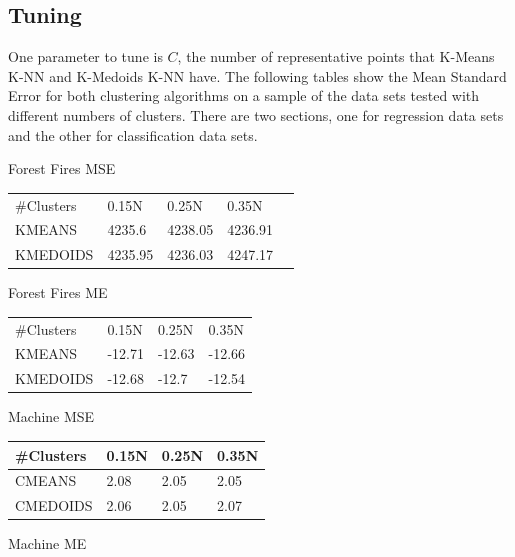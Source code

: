 \documentclass[twoside,11pt]{article}
\begin{document}
\subsection{Tuning}

One parameter to tune is $C$, the number of representative points that K-Means K-NN and K-Medoids K-NN have. The following tables show the Mean Standard Error for both clustering algorithms on a sample of the data sets tested with different numbers of clusters. There are two sections, one for regression data sets and the other for classification data sets.

\begin{table}[h]
	\begin{minipage}[b]{0.45\linewidth}\centering
		Forest Fires MSE
		\begin{tabular}{lllll}
			\cline{1-4}
			\#Clusters & 0.15N   & 0.25N   & 0.35N   &  \\ \cline{1-4}
			KMEANS     & 4235.6  & 4238.05 & 4236.91 &  \\
			KMEDOIDS   & 4235.95 & 4236.03 & 4247.17 &  \\
		\end{tabular}
	\end{minipage}
	\hspace{0.5cm}
	\begin{minipage}[b]{0.45\linewidth}
		Forest Fires ME
		\centering
		\begin{tabular}{llll}
			\cline{1-4}
			\#Clusters & 0.15N  & 0.25N  & 0.35N  \\ \cline{1-4}
			KMEANS     & -12.71 & -12.63 & -12.66 \\
			KMEDOIDS   & -12.68 & -12.7  & -12.54
		\end{tabular}
	\end{minipage}
	\begin{minipage}[b]{0.45\linewidth}\centering
		Machine MSE
		\begin{tabular}{llll}
			\hline
			\#Clusters & 0.15N & 0.25N & 0.35N \\ \hline
			CMEANS     & 2.08  & 2.05  & 2.05  \\
			CMEDOIDS   & 2.06  & 2.05  & 2.07
		\end{tabular}
	\end{minipage}
	\hspace{0.5cm}
	\begin{minipage}[b]{0.45\linewidth}
		Machine ME
		\centering

\end{minipage}
\end{table}
\end{document}
